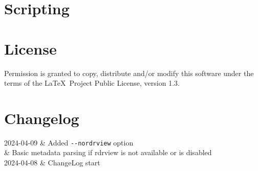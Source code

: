 \documentclass{article}
\makeatletter
\newenvironment{changelog}{\longtable{@{} l p{30em}}}{\endlongtable}
\newcommand\change[2]{#1 & #2\\}
\makeatother
\begin{document}
\section{Scripting}

\section{License}

Permission is granted to copy, distribute and/or modify this software
under the terms of the \LaTeX\ Project Public License, version 1.3.

\section{Changelog}
\begin{changelog}
  \change{2024-04-09}{Added \texttt{-\/-nordrview} option}
  \change{}{Basic metadata parsing if rdrview is not available or is disabled}
  \change{2024-04-08}{ChangeLog start}
\end{changelog}
\end{document}
